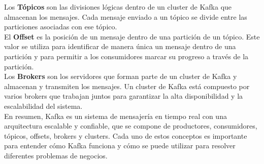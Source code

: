 \documentclass{article}
\begin{document}
Los \textbf{Tópicos} son las divisiones lógicas dentro de un cluster de Kafka que almacenan los mensajes. Cada mensaje enviado a un tópico se divide entre las particiones asociadas con ese tópico.\\

El \textbf{Offset} es la posición de un mensaje dentro de una partición de un tópico. Este valor se utiliza para identificar de manera única un mensaje dentro de una partición y para permitir a los consumidores marcar su progreso a través de la partición.\\

Los \textbf{Brokers} son los servidores que forman parte de un cluster de Kafka y almacenan y transmiten los mensajes. Un cluster de Kafka está compuesto por varios brokers que trabajan juntos para garantizar la alta disponibilidad y la escalabilidad del sistema.\\

En resumen, Kafka es un sistema de mensajería en tiempo real con una arquitectura escalable y confiable, que se compone de productores, consumidores, tópicos, offsets, brokers y clusters. Cada uno de estos conceptos es importante para entender cómo Kafka funciona y cómo se puede utilizar para resolver diferentes problemas de negocios.
\newpage
\end{document}
